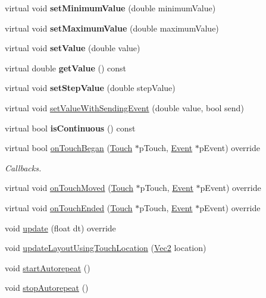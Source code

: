 \begin{DoxyCompactItemize}
virtual void {\bfseries set\+Minimum\+Value} (double minimum\+Value)
\item 
\mbox{\label{classControlStepper_a1f04c37ae47b642e7f84e6fd89789f7c}} 
virtual void {\bfseries set\+Maximum\+Value} (double maximum\+Value)
\item 
\mbox{\label{classControlStepper_a2211088d9a315c548b23e0298b1baaf6}} 
virtual void {\bfseries set\+Value} (double value)
\item 
\mbox{\label{classControlStepper_a03a26d5523b1fb64e255b424dbbb7f83}} 
virtual double {\bfseries get\+Value} () const
\item 
\mbox{\label{classControlStepper_aef8f06006edb17c8effb509245b4e0b3}} 
virtual void {\bfseries set\+Step\+Value} (double step\+Value)
\item 
virtual void \hyperlink{classControlStepper_af591de86f70b05305db312475a367401}{set\+Value\+With\+Sending\+Event} (double value, bool send)
\item 
\mbox{\label{classControlStepper_aac43f8c4b0caa59ffac7b00419fbf237}} 
virtual bool {\bfseries is\+Continuous} () const
\item 
virtual bool \hyperlink{classControlStepper_a7fbb969bb376da49033a5df63f562905}{on\+Touch\+Began} (\hyperlink{classTouch}{Touch} $\ast$p\+Touch, \hyperlink{classEvent}{Event} $\ast$p\+Event) override
\begin{DoxyCompactList}\small\item\em Callbacks. \end{DoxyCompactList}\item 
virtual void \hyperlink{classControlStepper_ae79c66bc7b2a2f44fbfe2fa3a5782ee9}{on\+Touch\+Moved} (\hyperlink{classTouch}{Touch} $\ast$p\+Touch, \hyperlink{classEvent}{Event} $\ast$p\+Event) override
\item 
virtual void \hyperlink{classControlStepper_a7934349dae09881fce7a72d4985d0154}{on\+Touch\+Ended} (\hyperlink{classTouch}{Touch} $\ast$p\+Touch, \hyperlink{classEvent}{Event} $\ast$p\+Event) override
\item 
void \hyperlink{classControlStepper_a29a2d69a159c790691365db8a9f87d33}{update} (float dt) override
\item 
void \hyperlink{classControlStepper_adf8058658ff4555b71ace43f54f60a56}{update\+Layout\+Using\+Touch\+Location} (\hyperlink{classVec2}{Vec2} location)
\item 
void \hyperlink{classControlStepper_ac4d31486530d38b21525418205cfc086}{start\+Autorepeat} ()
\item 
void \hyperlink{classControlStepper_ab7bdf3d5a93aa96f7ba67f2896b2baec}{stop\+Autorepeat} ()
\end{DoxyCompactItemize}
